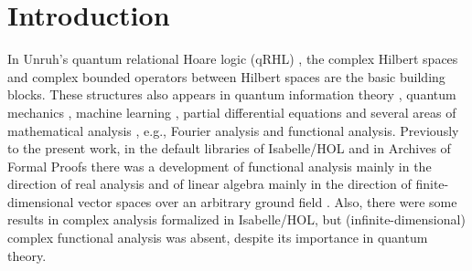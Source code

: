 \documentclass[12pt]{article}
\theoremstyle{definition}
\begin{document}
\maketitle

\begin{abstract}
We develop a new library in Isabelle/HOL for the theory of complex bounded operators. Our library is an extension of earlier formalizations of the basics notions of functional analysis that were limited to the real numbers as the ground field. Our library contains a type classes corresponding to complex vector spaces, complex normed spaces, the complex Banach spaces, the complex Hilbert spaces and finite-dimensional versions. We define a type of $\ell^2$ sequences of complex numbers indexed by a given type. We introduce a type for bounded operators between two complex vector spaces. Then we prove the essential properties of these objects and we add code generation for the cases when computation is possible.
$\newline$
\begin{flushleft} 
\textbf{Categories and Subject Descriptors.} F.4.1 [Mathematical Logic]:
Mechanical theorem proving; G.4.2 [Certification and testing]; G.4.9 [Verification]
$\newline$

\textbf{Keywords.} complex Hilbert spaces, complex bounded operators, Isabelle/HOL, formal verification
\end{flushleft}
\end{abstract}


\section{Introduction}
In Unruh's quantum relational Hoare logic (qRHL) \cite{unruh2019quantum}, the complex Hilbert spaces and complex bounded operators between Hilbert spaces are the basic building blocks. These structures also appears in quantum information theory \cite{wilde2013quantum}, quantum mechanics \cite{prugovecki1982quantum}, machine learning \cite{zhang2012refinement}, partial differential equations \cite{picard2011partial} and several areas of mathematical analysis \cite{conway2019course}, e.g., Fourier analysis and functional analysis. Previously to the present work, in the default libraries of Isabelle/HOL and in Archives of Formal Proofs there was a development of functional analysis mainly in the direction of real analysis \cite{fleuriot2000mechanization, fleuriot2000mechanizing, holzl2011three, holzl2013type, boldo2016formalization}
 and of linear algebra mainly in the direction of finite-dimensional vector spaces over an arbitrary ground field \cite{thiemann2016formalizing}. Also, there were some results in complex analysis \cite{li2020evaluating, eberl2019nine, li2019counting} formalized in Isabelle/HOL, but (infinite-dimensional) complex functional analysis was absent, despite its importance in quantum theory.
\end{document}
